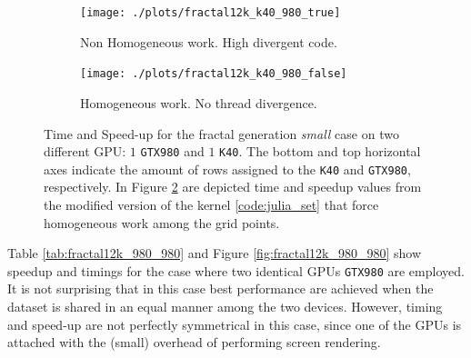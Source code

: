  \begin{figure}
     
     \begin{subfigure}{1.0\textwidth}
         \caption{Non Homogeneous work. High divergent code.}
         \texttt{[image: ./plots/fractal12k\_k40\_980\_true]}
         \label{fig:julia_two_GPU_true}
         
     \end{subfigure}        
     \endminipage\hfill
     \vspace{5mm}
     \begin{subfigure}{1.0\textwidth}
             \caption{Homogeneous work. No thread divergence.}
         \texttt{[image: ./plots/fractal12k\_k40\_980\_false]}
         \label{fig:julia_two_GPU_false}
     
     \end{subfigure}
     \endminipage\hfill
    
     \caption[Time and speed-up for the fractal generation fractal generation \textit{small} case on two different GPU: $1$ \texttt{GTX980} and $1$ \texttt{K40}.]{Time and Speed-up for the fractal generation \textit{small} case on two different GPU: $1$ \texttt{GTX980} and $1$ \texttt{K40}. The bottom and top horizontal axes indicate the amount of rows assigned to the \texttt{K40} and \texttt{GTX980}, respectively. In Figure \ref{fig:julia_two_GPU_false} are depicted time and speedup values from the modified version of the kernel \ref{code:julia_set} that force homogeneous work among the grid points.  }
     \label{fig:julia_two_GPU}
 \end{figure}

Table \ref{tab:fractal12k_980_980} and Figure \ref{fig:fractal12k_980_980} show speedup and timings for the case where two identical GPUs \texttt{GTX980} are employed. 
It is not surprising that in this case best performance are achieved when the dataset is shared in an equal manner among the two devices. However, timing and speed-up are not perfectly symmetrical in this case, since one of the GPUs is attached with the (small) overhead of performing screen rendering.

